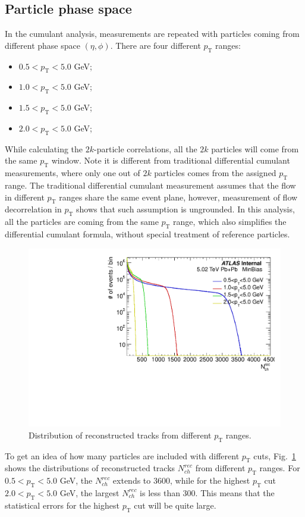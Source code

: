 \subsection{Particle phase space}
In the cumulant analysis, measurements are repeated with particles coming from different phase space $(\eta,\phi)$. There are four different $p_\text{T}$ ranges:
\begin{itemize}
\item $0.5<p_\text{T}<5.0$ GeV;
\item $1.0<p_\text{T}<5.0$ GeV;
\item $1.5<p_\text{T}<5.0$ GeV;
\item $2.0<p_\text{T}<5.0$ GeV;
\end{itemize}
While calculating the $2k$-particle correlations, all the $2k$ particles will come from the same $p_\text{T}$ window. Note it is different from traditional differential cumulant measurements, where only one out of $2k$ particles comes from the assigned $p_\text{T}$ range. The traditional differential cumulant measurement assumes that the flow in different $p_\text{T}$ ranges share the same event plane, however, measurement of flow decorrelation in $p_\text{T}$ shows that such assumption is ungrounded. In this analysis, all the particles are coming from the same $p_\text{T}$ range, which also simplifies the differential cumulant formula, without special treatment of reference particles.

\begin{figure}[H]
\centering
\includegraphics[width=.75\linewidth]{figs/sec_ana/cumuPhase_nTrkPt.pdf}
\caption{Distribution of reconstructed tracks from different $p_\text{T}$ ranges.}
\label{fig:cumuAna_PHASE_pt}
\end{figure}
To get an idea of how many particles are included with different $p_\text{T}$ cuts, Fig.~\ref{fig:cumuAna_PHASE_pt} shows the distributions of reconstructed tracks $N_{ch}^{rec}$ from different $p_\text{T}$ ranges. For $0.5<p_\text{T}<5.0$ GeV, the $N_{ch}^{rec}$ extends to 3600, while for the highest $p_\text{T}$ cut $2.0<p_\text{T}<5.0$ GeV, the largest $N_{ch}^{rec}$ is less than 300. This means that the statistical errors for the highest $p_\text{T}$ cut will be quite large.

